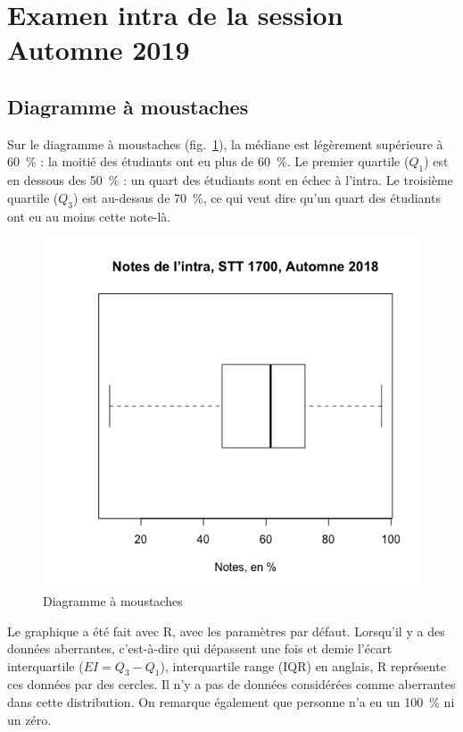 \documentclass[10pt,twocolumn]{article}
\begin{document}
\section{Examen intra de la session Automne 2019}
\subsection{Diagramme à moustaches}
Sur le diagramme à moustaches (fig.~\ref{intraBoxplot}), la médiane est légèrement supérieure à 60~\% : la moitié des étudiants ont eu plus de 60~\%. Le premier quartile ($Q_{1}$) est en dessous des 50~\% : un quart des étudiants sont en échec à l’intra. Le troisième quartile ($Q_{3}$) est au-dessus de 70~\%, ce qui veut dire qu’un quart des étudiants ont eu au moins cette note-là.

\begin{figure}[htbp]
	\caption{Diagramme à moustaches}
	\label{intraBoxplot}
	\centering
	\includegraphics[width=\linewidth]{d1_intraBoxplot}
\end{figure}

Le graphique a été fait avec R, avec les paramètres par défaut. Lorsqu’il y a des \og données aberrantes\fg{}, c’est-à-dire qui dépassent une fois et demie l’écart interquartile ($EI = Q_{3} - Q_{1}$), interquartile range (IQR) en anglais, R représente ces données par des cercles. Il n’y a pas de données considérées comme aberrantes dans cette distribution. On remarque également que personne n’a eu un 100~\% ni un zéro.
\end{document}
